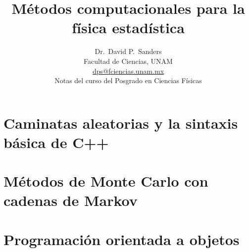 \documentclass[10pt,twoside,openany, letterpaper]{book}
\newcommand{\captionfonts}{\small}
\begin{document}
\makeatletter  %
\long\def\@makecaption#1#2{%
  \begin{quotation}
  \vskip\abovecaptionskip
  \sbox\@tempboxa{{\captionfonts \noindent \textbf{#1}: #2}}%
  \ifdim \wd\@tempboxa >\hsize
    {\captionfonts \noindent \textbf{#1}: #2\par}
  \else
    \hbox to\hsize{\hfil\box\@tempboxa\hfil}%
  \fi
  \vskip\belowcaptionskip \end{quotation}}
\makeatother   %

\renewcommand{\figurename}{Fig.}
\renewcommand{\partname}{Parte}






\title{\textbf{Métodos computacionales para la física estadística}}
\author{\Large Dr.~David P.~Sanders\\Facultad de Ciencias, UNAM\\
\url{dps@fciencias.unam.mx}\\[20pt]
Notas del curso del Posgrado en Ciencias Físicas 
}
\maketitle



\pagebreak





\part{Caminatas aleatorias y la sintaxis básica de C++}






\part{Métodos de Monte Carlo con cadenas de Markov}




\part{Programación orientada a objetos}



%

\end{document}
